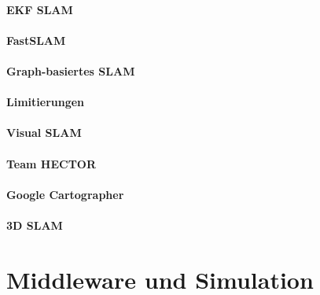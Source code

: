 \documentclass[a4paper, 11pt, accentcolor = tud3b]{tudreport}
\begin{document}
				\subsubsection{EKF SLAM} %

				\subsubsection{FastSLAM} %

				\subsubsection{Graph-basiertes SLAM} %

				\subsubsection{Limitierungen} %

				\subsubsection{Visual SLAM} %

				\subsubsection{Team HECTOR} %

				\subsubsection{Google Cartographer} %

				\subsubsection{3D SLAM} %

	\chapter{Middleware und Simulation} %
\end{document}
